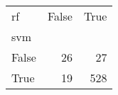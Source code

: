 \begin{tabular}{lrr}
\toprule
rf &  False &  True  \\
svm   &        &        \\
\midrule
False &     26 &     27 \\
True  &     19 &    528 \\
\bottomrule
\end{tabular}
